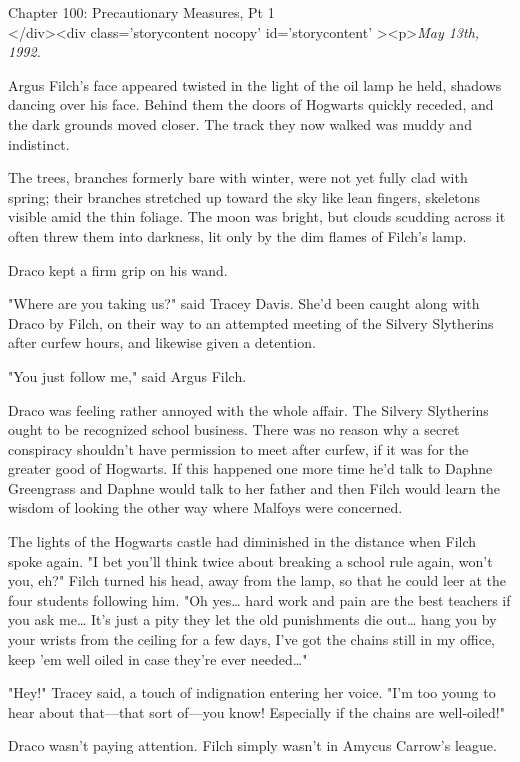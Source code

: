 
Chapter 100: Precautionary Measures, Pt 1\\
</div><div  class='storycontent nocopy' id='storycontent' ><p>\emph{May 13th, 1992.}

Argus Filch's face appeared twisted in the light of the oil lamp he held, shadows dancing over his face. Behind them the doors of Hogwarts quickly receded, and the dark grounds moved closer. The track they now walked was muddy and indistinct.

The trees, branches formerly bare with winter, were not yet fully clad with spring; their branches stretched up toward the sky like lean fingers, skeletons visible amid the thin foliage. The moon was bright, but clouds scudding across it often threw them into darkness, lit only by the dim flames of Filch's lamp.

Draco kept a firm grip on his wand.

"Where are you taking us?" said Tracey Davis. She'd been caught along with Draco by Filch, on their way to an attempted meeting of the Silvery Slytherins after curfew hours, and likewise given a detention.

"You just follow me," said Argus Filch.

Draco was feeling rather annoyed with the whole affair. The Silvery Slytherins ought to be recognized school business. There was no reason why a secret conspiracy shouldn't have permission to meet after curfew, if it was for the greater good of Hogwarts. If this happened one more time he'd talk to Daphne Greengrass and Daphne would talk to her father and then Filch would learn the wisdom of looking the other way where Malfoys were concerned.

The lights of the Hogwarts castle had diminished in the distance when Filch spoke again. "I bet you'll think twice about breaking a school rule again, won't you, eh?" Filch turned his head, away from the lamp, so that he could leer at the four students following him. "Oh yes{\ldots} hard work and pain are the best teachers if you ask me{\ldots} It's just a pity they let the old punishments die out{\ldots} hang you by your wrists from the ceiling for a few days, I've got the chains still in my office, keep 'em well oiled in case they're ever needed{\ldots}"

"Hey!" Tracey said, a touch of indignation entering her voice. "I'm too young to hear about that---that sort of---you know! Especially if the chains are well-oiled!"

Draco wasn't paying attention. Filch simply wasn't in Amycus Carrow's league.

